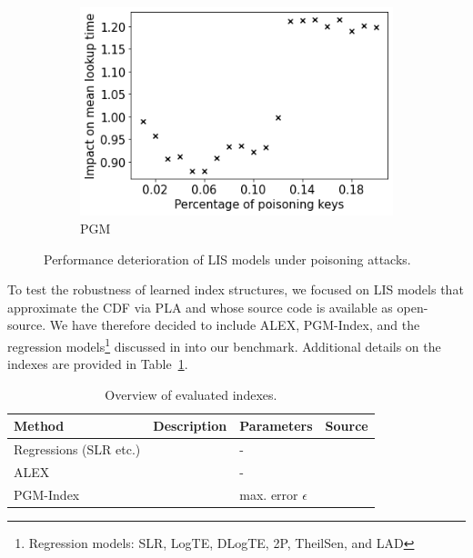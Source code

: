 \documentclass[sigconf]{acmart}
\begin{document}
\begin{figure}[h]
\begin{subfigure}[b]{0.24\textwidth}
        \includegraphics[width=\textwidth]{figures/learned_indexes-mean_lookup_time-deterioration_pgm.png}
        \caption{PGM}
    \end{subfigure}
    \caption{Performance deterioration of LIS models under poisoning attacks.}
    \label{fig:performance_deterioration}
    \vspace{-1em}
\end{figure}

To test the robustness of learned index structures, we focused on \ac{LIS} models that approximate the \ac{CDF} via \ac{PLA} and whose source code is available as open-source. We have therefore decided to include \ac{ALEX}, \ac{PGM}-Index, and the regression models\footnote{Regression models: SLR, LogTE, DLogTE, 2P, TheilSen, and LAD} discussed in \cite{RN696} into our benchmark. Additional details on the indexes are provided in Table~\ref{tab:evaluated_indexes}.

\begin{table}[tbh]
  \begin{tabular}{llll}
        \toprule
        Method & Description & Parameters & Source \\
        \midrule
        Regressions (SLR etc.) & \cite{RN696} & - & \cite{sourcecode-logarithmic-error-regression} \\
        ALEX & \cite{RN388} & - & \cite{sourcecode-alex} \\
        PGM-Index & \cite{RN400} & max. error $\epsilon$ & \cite{sourcecode-pgm} \\
        \bottomrule
    \end{tabular}
  \caption{Overview of evaluated indexes.}
  \label{tab:evaluated_indexes}
\end{table}
\end{document}
